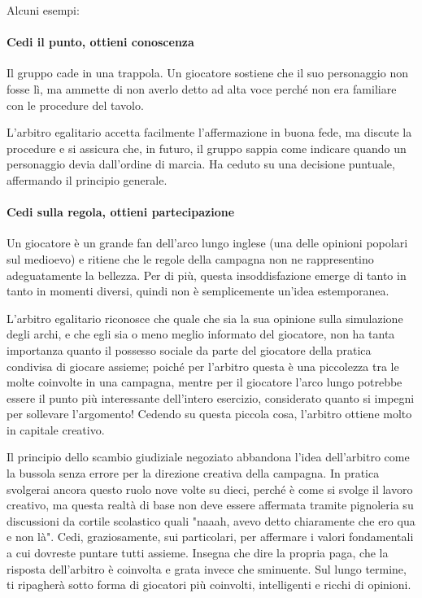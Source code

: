 Alcuni esempi:

\paragraph{Cedi il punto, ottieni conoscenza} Il gruppo cade in una trappola. Un giocatore sostiene che il suo personaggio non fosse lì, ma ammette di non averlo detto ad alta voce perché non era familiare con le procedure del tavolo.

L'arbitro egalitario accetta facilmente l'affermazione in buona fede, ma discute la procedure e si assicura che, in futuro, il gruppo sappia come indicare quando un personaggio devia dall'ordine di marcia. Ha ceduto su una decisione puntuale, affermando il principio generale.

\paragraph{Cedi sulla regola, ottieni partecipazione} Un giocatore è un grande fan dell'arco lungo inglese (una delle opinioni popolari sul medioevo) e ritiene che le regole della campagna non ne rappresentino adeguatamente la bellezza. Per di più, questa insoddisfazione emerge di tanto in tanto in momenti diversi, quindi non è semplicemente un'idea estemporanea.

L'arbitro egalitario riconosce che quale che sia la sua opinione sulla simulazione degli archi, e che egli sia o meno meglio informato del giocatore, non ha tanta importanza quanto il possesso sociale da parte del giocatore della pratica condivisa di giocare assieme; poiché per l'arbitro questa è una piccolezza tra le molte coinvolte in una campagna, mentre per il giocatore l'arco lungo potrebbe essere il punto più interessante dell'intero esercizio, considerato quanto si impegni per sollevare l'argomento! Cedendo su questa piccola cosa, l'arbitro ottiene molto in capitale creativo.

Il principio dello scambio giudiziale negoziato abbandona l'idea dell'arbitro come la bussola senza errore per la direzione creativa della campagna. In pratica svolgerai ancora questo ruolo nove volte su dieci, perché è come si svolge il lavoro creativo, ma questa realtà di base non deve essere affermata tramite pignoleria su discussioni da cortile scolastico quali "naaah, avevo detto chiaramente che ero qua e non là". Cedi, graziosamente, sui particolari, per affermare i valori fondamentali a cui dovreste puntare tutti assieme. Insegna che dire la propria paga, che la risposta dell'arbitro è coinvolta e grata invece che sminuente. Sul lungo termine, ti ripagherà sotto forma di giocatori più coinvolti, intelligenti e ricchi di opinioni.

